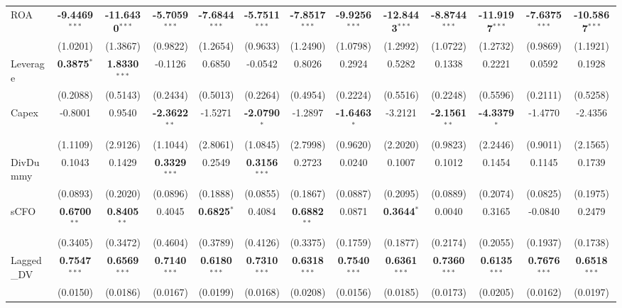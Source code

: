 \documentclass[11pt,a4paper]{article}
\begin{document}
\begin{table}[htbp]
\begin{tabular}{lcccccccccccc}
ROA & \textbf{-9.4469}$^{***}$ & \textbf{-11.6430}$^{***}$ & \textbf{-5.7059}$^{***}$ & \textbf{-7.6844}$^{***}$ & \textbf{-5.7511}$^{***}$ & \textbf{-7.8517}$^{***}$ & \textbf{-9.9256}$^{***}$ & \textbf{-12.8443}$^{***}$ & \textbf{-8.8744}$^{***}$ & \textbf{-11.9197}$^{***}$ & \textbf{-7.6375}$^{***}$ & \textbf{-10.5867}$^{***}$ \\
 & (1.0201) & (1.3867) & (0.9822) & (1.2654) & (0.9633) & (1.2490) & (1.0798) & (1.2992) & (1.0722) & (1.2732) & (0.9869) & (1.1921) \\
Leverage & \textbf{0.3875}$^{*}$ & \textbf{1.8330}$^{***}$ & -0.1126 & 0.6850 & -0.0542 & 0.8026 & 0.2924 & 0.5282 & 0.1338 & 0.2221 & 0.0592 & 0.1928 \\
 & (0.2088) & (0.5143) & (0.2434) & (0.5013) & (0.2264) & (0.4954) & (0.2224) & (0.5516) & (0.2248) & (0.5596) & (0.2111) & (0.5258) \\
Capex & -0.8001 & 0.9540 & \textbf{-2.3622}$^{**}$ & -1.5271 & \textbf{-2.0790}$^{*}$ & -1.2897 & \textbf{-1.6463}$^{*}$ & -3.2121 & \textbf{-2.1561}$^{**}$ & \textbf{-4.3379}$^{*}$ & -1.4770 & -2.4356 \\
 & (1.1109) & (2.9126) & (1.1044) & (2.8061) & (1.0845) & (2.7998) & (0.9620) & (2.2020) & (0.9823) & (2.2446) & (0.9011) & (2.1565) \\
DivDummy & 0.1043 & 0.1429 & \textbf{0.3329}$^{***}$ & 0.2549 & \textbf{0.3156}$^{***}$ & 0.2723 & 0.0240 & 0.1007 & 0.1012 & 0.1454 & 0.1145 & 0.1739 \\
 & (0.0893) & (0.2020) & (0.0896) & (0.1888) & (0.0855) & (0.1867) & (0.0887) & (0.2095) & (0.0889) & (0.2074) & (0.0825) & (0.1975) \\
sCFO & \textbf{0.6700}$^{**}$ & \textbf{0.8405}$^{**}$ & 0.4045 & \textbf{0.6825}$^{*}$ & 0.4084 & \textbf{0.6882}$^{**}$ & 0.0871 & \textbf{0.3644}$^{*}$ & 0.0040 & 0.3165 & -0.0840 & 0.2479 \\
 & (0.3405) & (0.3472) & (0.4604) & (0.3789) & (0.4126) & (0.3375) & (0.1759) & (0.1877) & (0.2174) & (0.2055) & (0.1937) & (0.1738) \\
Lagged\_DV & \textbf{0.7547}$^{***}$ & \textbf{0.6569}$^{***}$ & \textbf{0.7140}$^{***}$ & \textbf{0.6180}$^{***}$ & \textbf{0.7310}$^{***}$ & \textbf{0.6318}$^{***}$ & \textbf{0.7540}$^{***}$ & \textbf{0.6361}$^{***}$ & \textbf{0.7360}$^{***}$ & \textbf{0.6135}$^{***}$ & \textbf{0.7676}$^{***}$ & \textbf{0.6518}$^{***}$ \\
 & (0.0150) & (0.0186) & (0.0167) & (0.0199) & (0.0168) & (0.0208) & (0.0156) & (0.0185) & (0.0173) & (0.0205) & (0.0162) & (0.0197) \\

\end{tabular}
\end{table}
\end{document}
